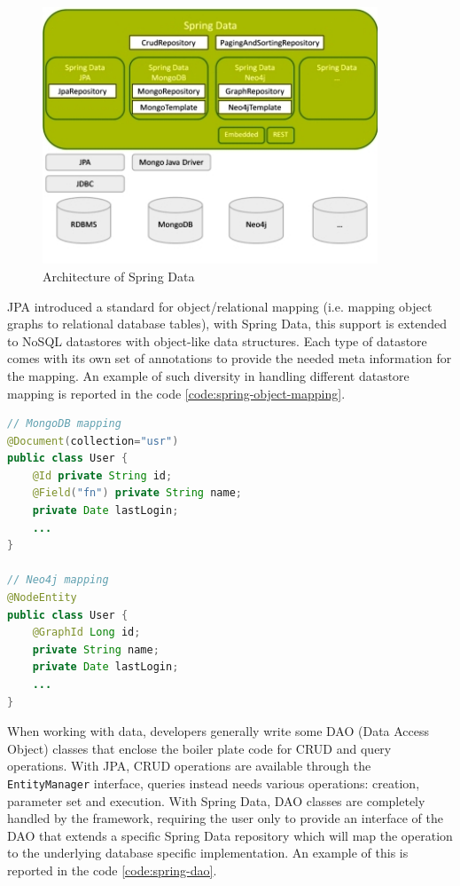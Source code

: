 \begin{figure}[tbh]
  \centering
  \includegraphics[width=10cm]{images/spring_data_overview}
  \caption{Architecture of Spring Data \cite{online:spring-data-overview}}
  \label{fig:spring-data-overview}
\end{figure}

\noindent JPA introduced a standard for object/relational mapping (i.e. mapping object graphs to relational database tables), with Spring Data, this support is extended to NoSQL datastores with object-like data structures.
Each type of datastore comes with its own set of annotations to provide the needed meta information for the mapping. An example of such diversity in handling different datastore mapping is reported in the code \ref{code:spring-object-mapping}.

\begin{lstlisting}[language=Java, caption=Spring Data object mapping, label=code:spring-object-mapping]
// MongoDB mapping
@Document(collection="usr")
public class User {
    @Id private String id;
    @Field("fn") private String name;
    private Date lastLogin;
    ...
}

// Neo4j mapping
@NodeEntity
public class User {
    @GraphId Long id;
    private String name;
    private Date lastLogin;
    ...
}
\end{lstlisting}

\noindent When working with data, developers generally write some DAO (Data Access Object) classes that enclose the boiler plate code for CRUD and query operations.
With JPA, CRUD operations are available through the \texttt{EntityManager} interface, queries instead needs various operations: creation, parameter set and execution.
With Spring Data, DAO classes are completely handled by the framework, requiring the user only to provide an interface of the DAO that extends a specific Spring Data repository which will map the operation to the underlying database specific implementation.
An example of this is reported in the code \ref{code:spring-dao}.

